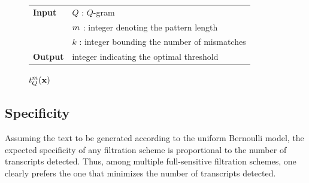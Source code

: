 
\begin{figure}[b]
\begin{center}
\begin{minipage}[t]{.8\textwidth}
\begin{algorithm}[H]
\begin{tabular}{ll}
\textbf{Input}  & $Q$ : $Q$-gram\\
				& $m$ : integer denoting the pattern length\\
				& $k$ : integer bounding the number of mismatches\\
\textbf{Output} & integer indicating the optimal threshold\\
\end{tabular}
\begin{algorithmic}[1]
\EndWhile
\State \Return $t^{m}_Q(\mathbf{x})$
\end{algorithmic}
\label{alg:qgram-threshold-apx}
\end{algorithm}
\end{minipage}
\end{center}
\end{figure}


\subsection{Specificity}
\label{sub:qgram-specificity}

Assuming the text to be generated according to the uniform Bernoulli model, the expected specificity of any filtration scheme is proportional to the number of transcripts detected.
Thus, among multiple full-sensitive filtration schemes, one clearly prefers the one that minimizes the number of transcripts detected.

